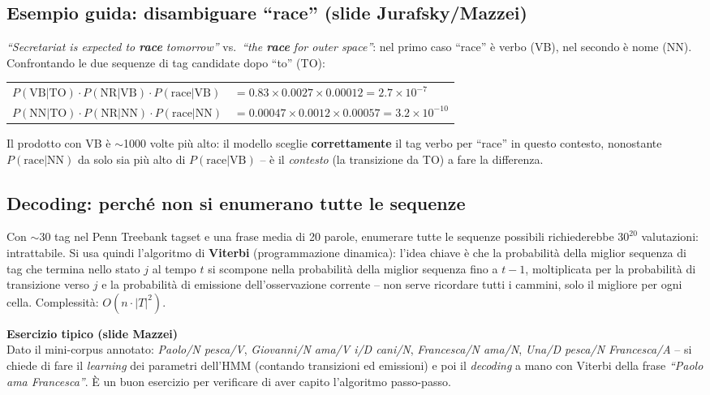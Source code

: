 \documentclass[12pt,a4paper]{article}
\begin{document}
\subsection{Esempio guida: disambiguare ``race'' (slide Jurafsky/Mazzei)}

\textit{``Secretariat is expected to \textbf{race} tomorrow''} vs.\ \textit{``the \textbf{race} for outer space''}: nel primo caso ``race'' è verbo (VB), nel secondo è nome (NN). Confrontando le due sequenze di tag candidate dopo ``to'' (TO):
\begin{center}
\small
\begin{tabular}{ll}
\toprule
$P(\text{VB}|\text{TO}) \cdot P(\text{NR}|\text{VB}) \cdot P(\text{race}|\text{VB})$ & $= 0.83 \times 0.0027 \times 0.00012 = 2.7\times 10^{-7}$ \\
$P(\text{NN}|\text{TO}) \cdot P(\text{NR}|\text{NN}) \cdot P(\text{race}|\text{NN})$ & $= 0.00047 \times 0.0012 \times 0.00057 = 3.2\times 10^{-10}$ \\
\bottomrule
\end{tabular}
\end{center}
Il prodotto con VB è $\sim$1000 volte più alto: il modello sceglie \textbf{correttamente} il tag verbo per ``race'' in questo contesto, nonostante $P(\text{race}|\text{NN})$ da solo sia più alto di $P(\text{race}|\text{VB})$ -- è il \emph{contesto} (la transizione da TO) a fare la differenza.

\subsection{Decoding: perché non si enumerano tutte le sequenze}

Con $\sim 30$ tag nel Penn Treebank tagset e una frase media di 20 parole, enumerare tutte le sequenze possibili richiederebbe $30^{20}$ valutazioni: intrattabile. Si usa quindi l'algoritmo di \textbf{Viterbi} (programmazione dinamica): l'idea chiave è che la probabilità della miglior sequenza di tag che termina nello stato $j$ al tempo $t$ si scompone nella probabilità della miglior sequenza fino a $t-1$, moltiplicata per la probabilità di transizione verso $j$ e la probabilità di emissione dell'osservazione corrente -- non serve ricordare tutti i cammini, solo il migliore per ogni cella. Complessità: $O(n \cdot |T|^2)$.

\begin{attenzione}
\textbf{Esercizio tipico (slide Mazzei)}\\
Dato il mini-corpus annotato: \textit{Paolo/N pesca/V}, \textit{Giovanni/N ama/V i/D cani/N}, \textit{Francesca/N ama/N}, \textit{Una/D pesca/N Francesca/A} -- si chiede di fare il \emph{learning} dei parametri dell'HMM (contando transizioni ed emissioni) e poi il \emph{decoding} a mano con Viterbi della frase \textit{``Paolo ama Francesca''}. È un buon esercizio per verificare di aver capito l'algoritmo passo-passo.
\end{attenzione}
\end{document}
